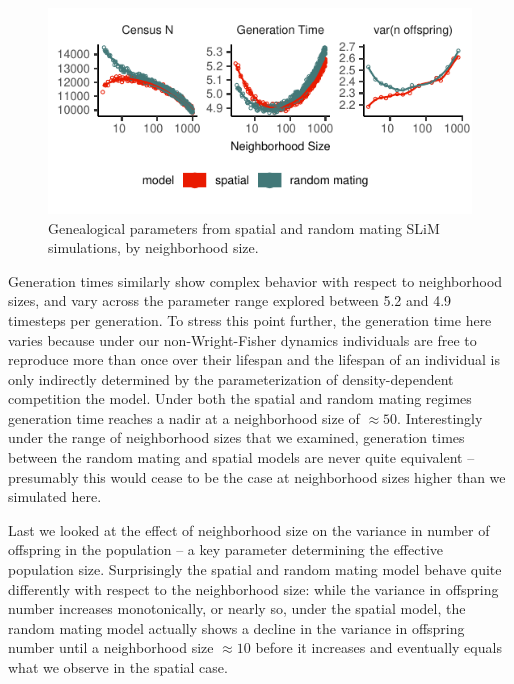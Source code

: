 \documentclass[11pt,twoside,lineno]{preprint}
\begin{document}
\begin{figure}[htbp]
\centering
\includegraphics{figures/pop_params.pdf}
\caption{Genealogical parameters from spatial and random mating SLiM simulations, by neighborhood size.}
\label{fig:genparams}
\end{figure}


Generation times similarly show complex behavior with respect to neighborhood sizes, and vary across the parameter range explored between 5.2 and 4.9 timesteps per generation. To stress this point further, the generation time here varies because under our non-Wright-Fisher dynamics individuals are free to reproduce more than once over their lifespan and the lifespan of an individual is only indirectly determined by the parameterization of density-dependent competition the model. Under both the spatial and random mating regimes generation time reaches a nadir at a neighborhood size of $\approx 50$. Interestingly under the range of neighborhood sizes that we examined, generation times between the random mating and spatial models are never quite equivalent -- presumably this would cease to be the case at neighborhood sizes higher than we simulated here.

Last we looked at the effect of neighborhood size on the variance in number of offspring in the population -- a key parameter determining the effective population size. Surprisingly the spatial and random mating model behave quite differently with respect to the neighborhood size: while the variance in offspring number increases monotonically, or nearly so, under the spatial model, the random mating model actually shows a decline in the variance in offspring number until a neighborhood size $\approx 10$ before it increases and eventually equals what we observe in the spatial case. 

\end{document}
